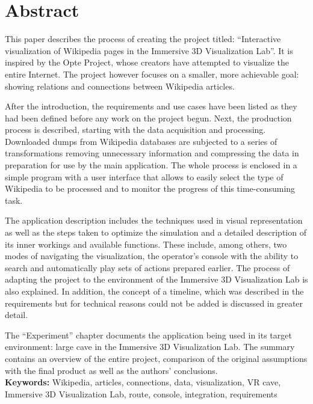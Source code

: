 \chapter*{Abstract}
This paper describes the process of creating the project titled: ``Interactive visualization of Wikipedia pages in the Immersive 3D Visualization Lab''. It is inspired by the Opte Project, whose creators have attempted to visualize the entire Internet. The project however focuses on a smaller, more achievable goal: showing relations and connections between Wikipedia articles.

After the introduction, the requirements and use cases have been listed as they had been defined before any work on the project begun. Next, the production process is described, starting with the data acquisition and processing. Downloaded dumps from Wikipedia databases are subjected to a series of transformations removing unnecessary information and compressing the data in preparation for use by the main application. The whole process is enclosed in a simple program with a user interface that allows to easily select the type of Wikipedia to be processed and to monitor the progress of this time-consuming task.

The application description includes the techniques used in visual representation as well as the steps taken to optimize the simulation and a detailed description of its inner workings and available functions. These include, among others, two modes of navigating the visualization, the operator's console with the ability to search and automatically play sets of actions prepared earlier. The process of adapting the project to the environment of the Immersive 3D Visualization Lab is also explained. In addition, the concept of a timeline, which was described in the requirements but for technical reasons could not be added is discussed in greater detail.

The ``Experiment'' chapter documents the application being used in its target environment: large cave in the Immersive 3D Visualization Lab. The summary contains an overview of the entire project, comparison of the original assumptions with the final product as well as the authors' conclusions.\\

\noindent\textbf{Keywords:} Wikipedia, articles, connections, data, visualization, VR cave, Immersive 3D Visualization Lab, route, console, integration, requirements
